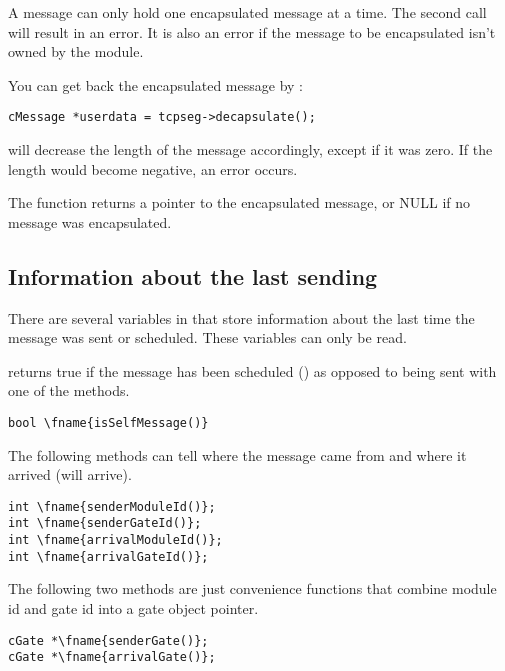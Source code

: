 A message can only hold one encapsulated message at a time. The
second  call will result in an error. It is also
an error if the message to be encapsulated isn't owned by the
module.

You can get back the encapsulated message by :

\begin{verbatim}
cMessage *userdata = tcpseg->decapsulate();
\end{verbatim}

 will decrease the length of the message accordingly,
except if it was zero. If the length would become negative, an
error occurs.


The  function returns a pointer to the encapsulated
message, or NULL if no message was encapsulated.





\subsection{Information about the last sending}

There are several variables in  that store
information about the last time the message was sent or
scheduled. These variables can only be read.

 returns true if the message has been scheduled
() as opposed to being sent with one of the
 methods.

\begin{Verbatim}[commandchars=\\\{\}]
bool \fname{isSelfMessage()}
\end{Verbatim}

The following methods can tell where the message came from and
where it arrived (will arrive).

\begin{Verbatim}[commandchars=\\\{\}]
int \fname{senderModuleId()};
int \fname{senderGateId()};
int \fname{arrivalModuleId()};
int \fname{arrivalGateId()};
\end{Verbatim}

The following two methods are just convenience functions that
combine module id and gate id into a gate object pointer.

\begin{Verbatim}[commandchars=\\\{\}]
cGate *\fname{senderGate()};
cGate *\fname{arrivalGate()};
\end{Verbatim}

